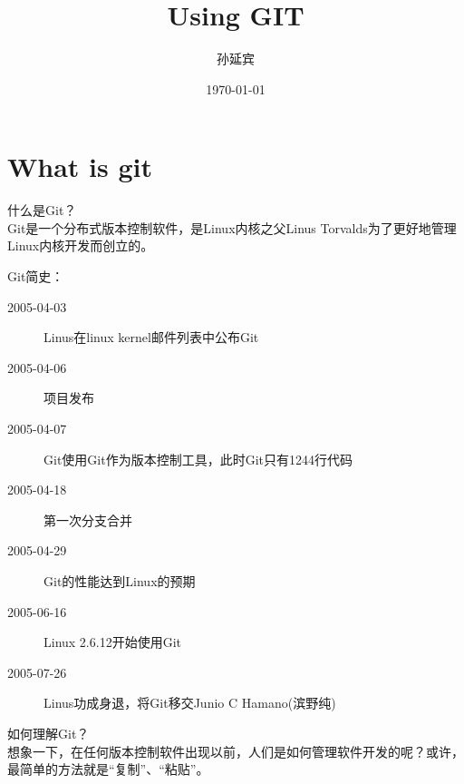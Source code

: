 ﻿\documentclass{beamer}
\title{\ttfamily Using GIT}
\author{孙延宾}
\institute{西安$\cdot$业务软件开发一部$\cdot$~\texttt{ZTE}}
\date{\today}
\begin{document}
\begin{frame}[plain]
  \titlepage
\end{frame}

\part[What is git]{What is git}
\begin{frame}
\begin{framedtext}
  什么是Git？\\[1em]
  Git是一个分布式版本控制软件，是Linux内核之父Linus Torvalds为了更好地管理Linux内核开发而创立的。
\end{framedtext}
\end{frame}

\begin{frame}
\begin{framedtext}
  Git简史：\par\bigskip
  \begin{description}
    \item[2005-04-03]  Linus在linux kernel邮件列表中公布Git
    \item[2005-04-06]  项目发布
    \item[2005-04-07]  Git使用Git作为版本控制工具，此时Git只有1244行代码
    \item[2005-04-18]  第一次分支合并
    \item[2005-04-29]  Git的性能达到Linux的预期
    \item[2005-06-16]  Linux 2.6.12开始使用Git
    \item[2005-07-26]  Linus功成身退，将Git移交Junio C Hamano(滨野纯)
  \end{description}
\end{framedtext}
\end{frame}

\begin{frame}
\begin{framedtext}
  如何理解Git？\\[1em]
  想象一下，在任何版本控制软件出现以前，人们是如何管理软件开发的呢？或许，最简单的方法就是“复制”、“粘贴”。
\end{framedtext}
\end{frame}
\end{document}
